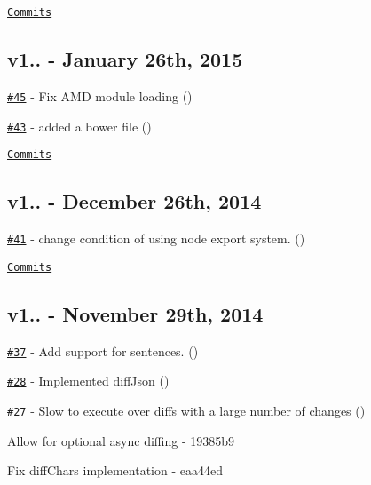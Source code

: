\href{https://github.com/kpdecker/jsdiff/compare/v1.2.2...v1.3.0}{\tt Commits}

\subsection*{v1.. -\/ January 26th, 2015}


\begin{DoxyItemize}
\item \href{https://github.com/kpdecker/jsdiff/pull/45}{\tt \#45} -\/ Fix A\+MD module loading (\href{https://api.github.com/users/pedrocarrico}{\tt })
\item \href{https://github.com/kpdecker/jsdiff/pull/43}{\tt \#43} -\/ added a bower file (\href{https://api.github.com/users/nbrustein}{\tt })
\end{DoxyItemize}

\href{https://github.com/kpdecker/jsdiff/compare/v1.2.1...v1.2.2}{\tt Commits}

\subsection*{v1.. -\/ December 26th, 2014}


\begin{DoxyItemize}
\item \href{https://github.com/kpdecker/jsdiff/pull/41}{\tt \#41} -\/ change condition of using node export system. (\href{https://api.github.com/users/ironhee}{\tt })
\end{DoxyItemize}

\href{https://github.com/kpdecker/jsdiff/compare/v1.2.0...v1.2.1}{\tt Commits}

\subsection*{v1.. -\/ November 29th, 2014}


\begin{DoxyItemize}
\item \href{https://github.com/kpdecker/jsdiff/pull/37}{\tt \#37} -\/ Add support for sentences. (\href{https://api.github.com/users/vmariano}{\tt })
\item \href{https://github.com/kpdecker/jsdiff/pull/28}{\tt \#28} -\/ Implemented diff\+Json (\href{https://api.github.com/users/papandreou}{\tt })
\item \href{https://github.com/kpdecker/jsdiff/issues/27}{\tt \#27} -\/ Slow to execute over diffs with a large number of changes (\href{https://api.github.com/users/termi}{\tt })
\item Allow for optional async diffing -\/ 19385b9
\item Fix diff\+Chars implementation -\/ eaa44ed
\end{DoxyItemize}

